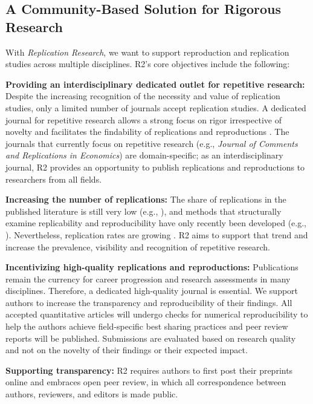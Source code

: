 \documentclass[11pt,a4paper]{article}
\begin{document}
\subsection{A Community-Based Solution for Rigorous
Research}\label{a-community-based-solution-for-rigorous-research}

With \emph{Replication Research}, we want to support reproduction and
replication studies across multiple disciplines. R2's core objectives
include the following:

\textbf{Providing an interdisciplinary dedicated outlet for repetitive
research:} Despite the increasing recognition of the necessity and value
of replication studies, only a limited number of journals accept
replication studies. A dedicated journal for repetitive research allows
a strong focus on rigor irrespective of novelty and facilitates the
findability of replications and reproductions
\autocite{Reed2025NoRoomInn}. The journals that currently focus on
repetitive research (e.g., \emph{Journal of Comments and Replications in
Economics}) are domain-specific; as an interdisciplinary journal, R2
provides an opportunity to publish replications and reproductions to
researchers from all fields.

\textbf{Increasing the number of replications:} The share of
replications in the published literature is still very low (e.g.,
\autocite{Perry2022DecadeReplicationEducation,Pridemore2018ReplicationCriminology}),
and methods that structurally examine replicability and reproducibility
have only recently been developed (e.g.,
\autocite{Heyard2025ScopingReproducibilityMetrics}). Nevertheless,
replication rates are growing
\autocite{Clarke2023PrevalenceDirectReplication,Reed2025NoRoomInn}. R2
aims to support that trend and increase the prevalence, visibility and
recognition of repetitive research.

\textbf{Incentivizing high-quality replications and reproductions:}
Publications remain the currency for career progression and research
assessments in many disciplines. Therefore, a dedicated high-quality
journal is essential. We support authors to increase the transparency
and reproducibility of their findings. All accepted quantitative
articles will undergo checks for numerical reproducibility to help the
authors achieve field-specific best sharing practices and peer review
reports will be published. Submissions are evaluated based on research
quality and not on the novelty of their findings or their expected
impact.

\textbf{Supporting transparency:} R2 requires authors to first post
their preprints online and embraces open peer review, in which all
correspondence between authors, reviewers, and editors is made public.
\end{document}
